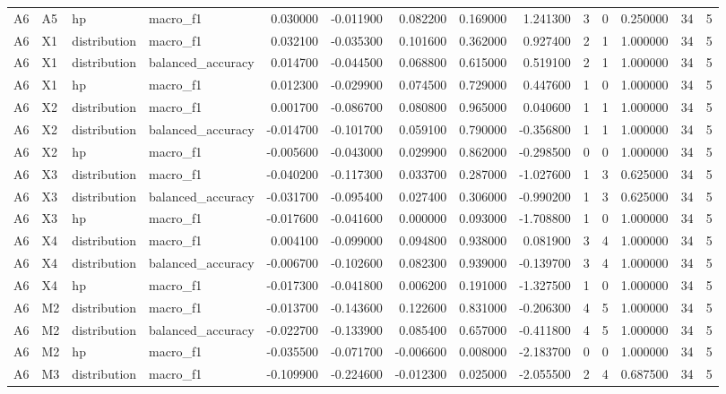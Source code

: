 \begin{table}
\begin{tabular}{llllrrrrrrrrrr}
A6 & A5 & hp & macro\_f1 & 0.030000 & -0.011900 & 0.082200 & 0.169000 & 1.241300 & 3 & 0 & 0.250000 & 34 & 5 \\
A6 & X1 & distribution & macro\_f1 & 0.032100 & -0.035300 & 0.101600 & 0.362000 & 0.927400 & 2 & 1 & 1.000000 & 34 & 5 \\
A6 & X1 & distribution & balanced\_accuracy & 0.014700 & -0.044500 & 0.068800 & 0.615000 & 0.519100 & 2 & 1 & 1.000000 & 34 & 5 \\
A6 & X1 & hp & macro\_f1 & 0.012300 & -0.029900 & 0.074500 & 0.729000 & 0.447600 & 1 & 0 & 1.000000 & 34 & 5 \\
A6 & X2 & distribution & macro\_f1 & 0.001700 & -0.086700 & 0.080800 & 0.965000 & 0.040600 & 1 & 1 & 1.000000 & 34 & 5 \\
A6 & X2 & distribution & balanced\_accuracy & -0.014700 & -0.101700 & 0.059100 & 0.790000 & -0.356800 & 1 & 1 & 1.000000 & 34 & 5 \\
A6 & X2 & hp & macro\_f1 & -0.005600 & -0.043000 & 0.029900 & 0.862000 & -0.298500 & 0 & 0 & 1.000000 & 34 & 5 \\
A6 & X3 & distribution & macro\_f1 & -0.040200 & -0.117300 & 0.033700 & 0.287000 & -1.027600 & 1 & 3 & 0.625000 & 34 & 5 \\
A6 & X3 & distribution & balanced\_accuracy & -0.031700 & -0.095400 & 0.027400 & 0.306000 & -0.990200 & 1 & 3 & 0.625000 & 34 & 5 \\
A6 & X3 & hp & macro\_f1 & -0.017600 & -0.041600 & 0.000000 & 0.093000 & -1.708800 & 1 & 0 & 1.000000 & 34 & 5 \\
A6 & X4 & distribution & macro\_f1 & 0.004100 & -0.099000 & 0.094800 & 0.938000 & 0.081900 & 3 & 4 & 1.000000 & 34 & 5 \\
A6 & X4 & distribution & balanced\_accuracy & -0.006700 & -0.102600 & 0.082300 & 0.939000 & -0.139700 & 3 & 4 & 1.000000 & 34 & 5 \\
A6 & X4 & hp & macro\_f1 & -0.017300 & -0.041800 & 0.006200 & 0.191000 & -1.327500 & 1 & 0 & 1.000000 & 34 & 5 \\
A6 & M2 & distribution & macro\_f1 & -0.013700 & -0.143600 & 0.122600 & 0.831000 & -0.206300 & 4 & 5 & 1.000000 & 34 & 5 \\
A6 & M2 & distribution & balanced\_accuracy & -0.022700 & -0.133900 & 0.085400 & 0.657000 & -0.411800 & 4 & 5 & 1.000000 & 34 & 5 \\
A6 & M2 & hp & macro\_f1 & -0.035500 & -0.071700 & -0.006600 & 0.008000 & -2.183700 & 0 & 0 & 1.000000 & 34 & 5 \\
A6 & M3 & distribution & macro\_f1 & -0.109900 & -0.224600 & -0.012300 & 0.025000 & -2.055500 & 2 & 4 & 0.687500 & 34 & 5 \\

\end{tabular}
\end{table}
